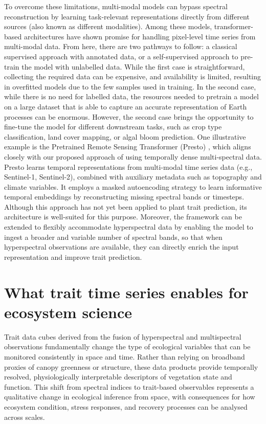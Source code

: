 \documentclass[pdflatex,sn-mathphys-num]{sn-jnl}%
\theoremstyle{thmstyleone}%
\theoremstyle{thmstyletwo}%
\theoremstyle{thmstylethree}%
\begin{document}
To overcome these limitations, multi-modal models can bypass spectral reconstruction by learning task-relevant representations directly from different sources (also known as different modalities). Among these models, transformer-based architectures have shown promise for handling pixel-level time series from multi-modal data. From here, there are two pathways to follow: a classical supervised approach with annotated data, or a self-supervised approach to pre-train the model with unlabelled data. While the first case is straightforward, collecting the required data can be expensive, and availability is limited, resulting in overfitted models due to the few samples used in training. In the second case, while there is no need for labelled data, the resources needed to pretrain a model on a large dataset that is able to capture an accurate representation of Earth processes can be enormous. However, the second case brings the opportunity to fine-tune the model for different downstream tasks, such as crop type classification, land cover mapping, or algal bloom prediction. One illustrative example is the Pretrained Remote Sensing Transformer (Presto) \cite{tseng2023lightweight}, which aligns closely with our proposed approach of using temporally dense multi-spectral data. Presto learns temporal representations from multi-modal time series data (e.g., Sentinel-1, Sentinel-2), combined with auxiliary metadata such as topography and climate variables. It employs a masked autoencoding strategy to learn informative temporal embeddings by reconstructing missing spectral bands or timesteps. Although this approach has not yet been applied to plant trait prediction, its architecture is well-suited for this purpose. Moreover, the framework can be extended to flexibly accommodate hyperspectral data by enabling the model to ingest a broader and variable number of spectral bands, so that when hyperspectral observations are available, they can directly enrich the input representation and improve trait prediction.


\section{What trait time series enables for ecosystem science} \label{sec3}

Trait data cubes derived from the fusion of hyperspectral and multispectral observations fundamentally change the type of ecological variables that can be monitored consistently in space and time. Rather than relying on broadband proxies of canopy greenness or structure, these data products provide temporally resolved, physiologically interpretable descriptors of vegetation state and function. This shift from spectral indices to trait-based observables represents a qualitative change in ecological inference from space, with consequences for how ecosystem condition, stress responses, and recovery processes can be analysed across scales.
\end{document}
